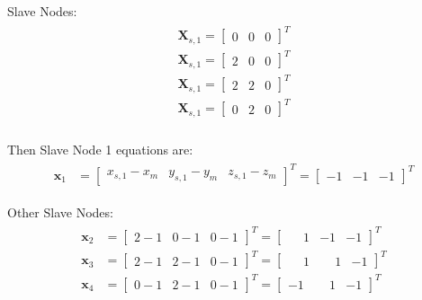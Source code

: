 \documentclass[10pt,b5paper,titlepage]{book}
\newcommand{\m}{\mathbf}
\newenvironment{eqarray}
{
    \begin{eqnarray}
        \begin{aligned}
}
{
        \end{aligned}
    \end{eqnarray}
}
\begin{document}
Slave Nodes:
\begin{eqarray}
    \m{X}_{s,1} =
    \begin{bmatrix}
        0 & 0 & 0
    \end{bmatrix}^T \\
    \m{X}_{s,1} =
    \begin{bmatrix}
        2 & 0 & 0
    \end{bmatrix}^T \\
    \m{X}_{s,1} =
    \begin{bmatrix}
        2 & 2 & 0
    \end{bmatrix}^T \\
    \m{X}_{s,1} =
    \begin{bmatrix}
        0 & 2 & 0
    \end{bmatrix}^T \\
\end{eqarray}

Then Slave Node 1 equations are:
\begin{eqarray}
    \m{x}_1 &=
    \begin{bmatrix}
        x_{s,1} - x_m & y_{s,1} - y_m & z_{s,1} - z_m
    \end{bmatrix}^T =
    \begin{bmatrix}
        -1 & -1 & -1
    \end{bmatrix}^T
\end{eqarray}

Other Slave Nodes:
\begin{eqarray}
    \m{x}_2 &=
    \begin{bmatrix}
        2 - 1 & 0 - 1 & 0 - 1
    \end{bmatrix}^T =
    \begin{bmatrix}
        \phantom{-}1 & -1 & -1
    \end{bmatrix}^T \\
    \m{x}_3 &=
    \begin{bmatrix}
        2 - 1 & 2 - 1 & 0 - 1
    \end{bmatrix}^T =
    \begin{bmatrix}
        \phantom{-}1 & \phantom{-}1 & -1
    \end{bmatrix}^T \\
    \m{x}_4 &=
    \begin{bmatrix}
        0 - 1 & 2 - 1 & 0 - 1
    \end{bmatrix}^T =
    \begin{bmatrix}
        -1 & \phantom{-}1 & -1
    \end{bmatrix}^T
\end{eqarray}
\end{document}
